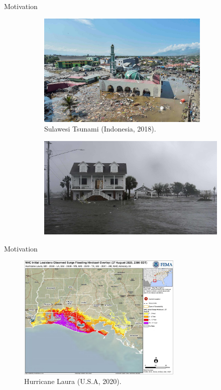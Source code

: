 \documentclass[pdf]{beamer}
\begin{document}
\begin{frame}{Motivation}
\begin{figure}
	\centering
	\begin{subfigure}{0.49\textwidth}
		\includegraphics[width=0.9\textwidth]{./Pics/Web/SualwesiTsunami.jpg}
		\caption{Sulawesi Tsunami (Indonesia, 2018).}
	\end{subfigure}
	\begin{subfigure}{0.49\textwidth}
	\includegraphics[width=1.1\textwidth]{./Pics/Web/HurricaneFlorence.jpg}
	\end{subfigure}
\end{figure}
\end{frame}

\begin{frame}{Motivation}
\begin{figure}
	\centering
	\includegraphics[width=0.7\textwidth]{./Pics/Web/StormSurgeLaura.jpeg}
	\caption{Hurricane Laura (U.S.A, 2020).}
\end{figure}
\end{frame}
\end{document}
